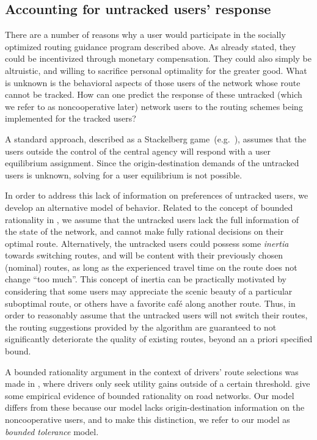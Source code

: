 \subsection{Accounting for untracked users' response\label{sub:Accounting-for-untracked}}

There are a number of reasons why a user would participate in the
socially optimized routing guidance program described above. As already
stated, they could be incentivized through monetary compensation.
They could also simply be altruistic, and willing to sacrifice personal
optimality for the greater good. What is unknown is the behavioral
aspects of those users of the network whose route cannot be tracked.
How can one predict the response of these untracked (which we refer
to as noncooperative later) network users to the routing schemes being
implemented for the tracked users?

A standard approach, described as a Stackelberg game~(e.g.~\cite{roughgarden2001stackelberg,Krichene2012,aswani2011game}),
assumes that the users outside the control of the central agency will
respond with a user equilibrium assignment. Since the origin-destination
demands of the untracked users is unknown, solving for a user equilibrium
is not possible.

In order to address this lack of information on preferences of untracked
users, we develop an alternative model of behavior. Related to the
concept of bounded rationality in \cite{Guo2011,Hu199751}, we assume
that the untracked users lack the full information of the state of
the network, and cannot make fully rational decisions on their optimal
route. Alternatively, the untracked users could possess some \emph{inertia}
towards switching routes, and will be content with their previously
chosen (nominal) routes, as long as the experienced travel time on
the route does not change ``too much''. This concept of inertia
can be practically motivated by considering that some users may appreciate
the scenic beauty of a particular suboptimal route, or others have
a favorite café along another route. Thus, in order to reasonably
assume that the untracked users will not switch their routes, the
routing suggestions provided by the algorithm are guaranteed to not
significantly deteriorate the quality of existing routes, beyond an
a priori specified bound.

A bounded rationality argument in the context of drivers' route selections
was made in \cite{Hu199751}, where drivers only seek utility gains
outside of a certain threshold. \cite{Guo2011} give some empirical
evidence of bounded rationality on road networks. Our model differs
from these because our model lacks origin-destination information
on the noncooperative users, and to make this distinction, we refer
to our model as \emph{bounded tolerance} model.


